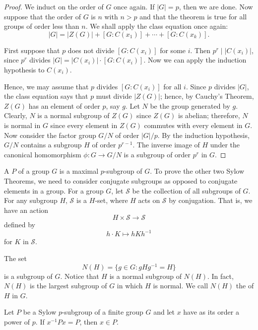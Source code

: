  
\begin{proof}
We induct on the order of $G$ once again.  If $|G|=p$, then we are
done. Now suppose that the order of $G$ is $n$ with $n > p$ and that the
theorem is true for all groups of order less than $n$. We shall apply
the class equation once again: 
\[
|G| = |Z(G)| + [G: C(x_1) ] + \cdots + [ G: C(x_k)].
\]
 
 
First suppose that $p$ does not divide $[G:C(x_i)]$ for some $i$. Then
\mbox{$p^r \mid |C(x_i)|$}, since $p^r$ divides $|G| = |C(x_i)| \cdot
[G:C(x_i)]$. Now we can apply the induction hypothesis to $C(x_i)$.  
 
 
Hence, we may assume that $p$ divides $[G:C(x_i)]$ for all $i$.
Since $p$ divides $|G|$, the class equation says that $p$ must
divide $|Z(G)|$; hence, by Cauchy's Theorem, $Z(G)$ has an element of
order $p$, say $g$. Let $N$ be the group generated by $g$. Clearly,
$N$ is a normal subgroup of $Z(G)$ since $Z(G)$ is abelian; therefore,
$N$ is normal in $G$ since every element in $Z(G)$ commutes with every
element in $G$. Now consider the factor group $G/N$ of order $|G|/p$.
By the induction hypothesis, $G/N$ contains a subgroup $H$ of order
$p^{r- 1}$. The inverse image of $H$ under the canonical homomorphism
$\phi : G \rightarrow G/N$ is a subgroup of order $p^r$ in $G$. 
\end{proof}
 
 
\medskip
 
 
A   $P$ of a group $G$ is a
maximal $p$-subgroup of $G$. To prove the other two Sylow Theorems, we
need to consider conjugate subgroups as opposed to conjugate elements
in a group. For a group $G$, let ${\mathcal S}$ be the collection of all
subgroups of $G$. For any subgroup $H$, ${\mathcal S}$ is a $H$-set, where 
$H$ acts on ${\mathcal S}$ by conjugation. That is, we have an action 
\[
H \times  {\mathcal S}  \rightarrow  {\mathcal S}
\]
defined by
\[
h \cdot K \mapsto hKh^{-1}
\]
for $K$ in ${\mathcal S}$.
 
 
The set
\[
N(H) = \{  g \in G : g H g^{-1} = H\}\label{notenormalizer}
\]
is a subgroup of $G$. Notice that $H$ is a normal subgroup of $N(H)$.
In fact, $N(H)$ is the largest subgroup of $G$ in which $H$ is normal.
We call $N(H)$ the  of $H$ in $G$.
 
 
\begin{lemma}\label{p_order_lemma}
Let $P$ be a Sylow $p$-subgroup of a finite group $G$ and let $x$ have
as its order a power of $p$. If $x^{-1} P x = P$, then $x \in P$.
\end{lemma}
 
